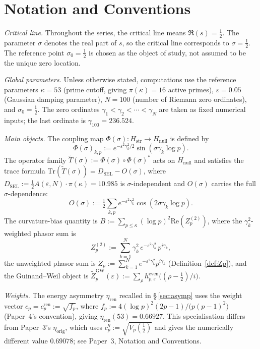 \documentclass[11pt]{article}
\newcommand{\Hstr}{H_{\mathrm{str}}}
\newcommand{\Hnull}{H_{\mathrm{null}}}
\newcommand{\etaorig}{\eta_{\mathrm{orig}}}
\newcommand{\etaren}{\eta_{\mathrm{ren}}}
\newcommand{\Tt}{\widetilde{T}}
\newcommand{\DSEL}{D_{\mathrm{SEL}}}
\begin{document}
\vspace{2em}

\section*{Notation and Conventions}
\label{sec:notation}

\emph{Critical line.}
Throughout the series, the critical line means $\Re(s)=\tfrac12$.
The parameter $\sigma$ denotes the real part of $s$, so the critical
line corresponds to $\sigma=\tfrac12$.
The reference point $\sigma_0=\tfrac12$ is chosen as the object of
study, not assumed to be the unique zero location.

\medskip
\emph{Global parameters.}
Unless otherwise stated, computations use the reference parameters
$\kappa=53$ (prime cutoff, giving $\pi(\kappa)=16$ active primes),
$\varepsilon=0.05$ (Gaussian damping parameter),
$N=100$ (number of Riemann zero ordinates), and
$\sigma_0=\tfrac12$.
The zero ordinates $\gamma_1<\gamma_2<\cdots<\gamma_N$ are taken
as fixed numerical inputs; the last ordinate is $\gamma_{100}=236.524$.

\medskip
\emph{Main objects.}
The coupling map $\Phi(\sigma)\colon\Hstr\to\Hnull$ is defined by
\[
\Phi(\sigma)_{k,p}
  :=e^{-\varepsilon^2\gamma_k^2/2}\sin(\sigma\gamma_k\log p).
\]
The operator family $\Tt(\sigma):=\Phi(\sigma)\circ\Phi(\sigma)^*$
acts on $\Hnull$ and satisfies the trace formula
$\mathrm{Tr}(\Tt(\sigma))=\DSEL-O(\sigma)$, where
$\DSEL:=\tfrac12 A(\varepsilon,N)\cdot\pi(\kappa)=10.985$ is
$\sigma$-independent and $O(\sigma)$ carries the full
$\sigma$-dependence:
\[
O(\sigma):=\tfrac12\sum_{k,p}e^{-\varepsilon^2\gamma_k^2}
\cos(2\sigma\gamma_k\log p).
\]
The curvature-bias quantity is
$B:=\sum_{p\leq\kappa}(\log p)^2\mathrm{Re}(Z_p^{(2)})$, where
the $\gamma_k^2$-weighted phasor sum is
\[
Z_p^{(2)}:=\sum_{k=1}^N \gamma_k^2\,
e^{-\varepsilon^2\gamma_k^2}\,p^{i\gamma_k},
\]
the unweighted phasor sum is
$Z_p:=\sum_{k=1}^N e^{-\varepsilon^2\gamma_k^2}p^{i\gamma_k}$
(Definition~\ref{def:Zp}), and the Guinand--Weil object is
$\widetilde Z_p^{\mathrm{GW}}(\varepsilon):=\sum_\rho h^{\mathrm{even}}_{p,\varepsilon}
\bigl((\rho-\tfrac12)/i\bigr)$.

\medskip
\emph{Weights.}
The energy asymmetry $\etaren$ recalled in \S\,\ref{sec:asymp}
uses the weight vector $c_p = c_p^{\mathrm{ren}} := \sqrt{f_p}$,
where $f_p := 4(\log p)^2(2p-1)/\bigl(p(p-1)^2\bigr)$
(Paper~4's convention), giving $\etaren(53)=0.66927$.
This specialisation differs from Paper~3's $\etaorig$,
which uses $c_p^{\eta}:=\sqrt{V_p(\tfrac{1}{2})}$
and gives the numerically different value $0.69078$;
see Paper~3, Notation and Conventions.
\end{document}
